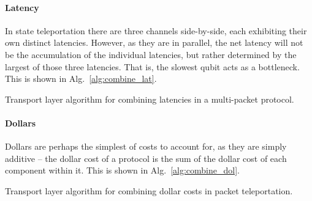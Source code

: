 
%
%

\paragraph{Latency} 

In state teleportation there are three channels side-by-side, each exhibiting their own distinct latencies. However, as they are in parallel, the net latency will not be the accumulation of the individual latencies, but rather determined by the largest of those three latencies. That is, the slowest qubit acts as a bottleneck. This is shown in Alg.~\ref{alg:combine_lat}.

\begin{table}[!htbp]
\caption{Transport layer algorithm for combining latencies in a multi-packet protocol.} \label{alg:combine_lat}
\end{table}


%
%

\paragraph{Dollars} 

Dollars are perhaps the simplest of costs to account for, as they are simply additive -- the dollar cost of a protocol is the sum of the dollar cost of each component within it. This is shown in Alg.~\ref{alg:combine_dol}.

\begin{table}[!htbp]
\caption{Transport layer algorithm for combining dollar costs in packet teleportation.} \label{alg:combine_dol}
\end{table}

